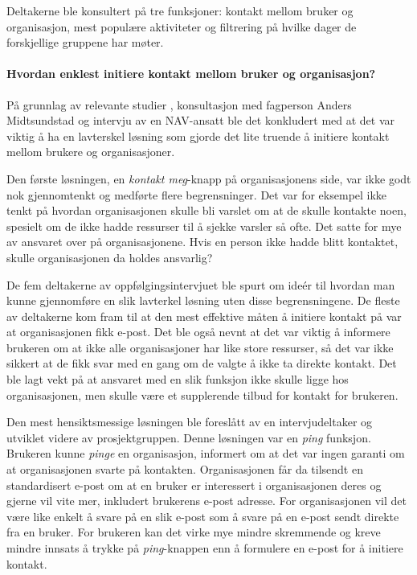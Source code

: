 Deltakerne ble konsultert på tre funksjoner: kontakt mellom bruker og organisasjon, mest populære aktiviteter og filtrering på hvilke dager de forskjellige gruppene har møter.

\paragraph{Hvordan enklest initiere kontakt mellom bruker og organisasjon?} 
På grunnlag av relevante studier %
, konsultasjon med fagperson Anders Midtsundstad \cite{MIDTSUNDSTAD-INTERVJU:15} og intervju av en NAV-ansatt \cite{NAV-INTERVJU:16} ble det konkludert med at det var viktig å ha en lavterskel løsning som gjorde det lite truende å initiere kontakt mellom brukere og organisasjoner.

Den første løsningen, en {\em  kontakt meg}-knapp på organisasjonens side, var ikke godt nok gjennomtenkt og medførte flere begrensninger. Det var for eksempel ikke tenkt på hvordan organisasjonen skulle bli varslet om at de skulle kontakte noen, spesielt om de ikke hadde ressurser til å sjekke varsler så ofte. Det satte for mye av ansvaret over på organisasjonene. Hvis en person ikke hadde blitt kontaktet, skulle organisasjonen da holdes ansvarlig?

De fem deltakerne av oppfølgingsintervjuet ble spurt om ideér til hvordan man kunne gjennomføre en slik lavterkel løsning uten disse begrensningene. De fleste av deltakerne kom fram til at den mest effektive måten å initiere kontakt på var at organisasjonen fikk e-post. Det ble også nevnt at det var viktig å informere brukeren om at ikke alle organisasjoner har like store ressurser, så det var ikke sikkert at de fikk svar med en gang om de valgte å ikke ta direkte kontakt. Det ble lagt vekt på at ansvaret med en slik funksjon ikke skulle ligge hos organisasjonen, men skulle være et supplerende tilbud for kontakt for brukeren. 

Den mest hensiktsmessige løsningen ble foreslått av en intervjudeltaker og utviklet videre av prosjektgruppen. Denne løsningen var en {\em ping} funksjon. Brukeren kunne {\em pinge} en organisasjon, informert om at det var ingen garanti om at organisasjonen svarte på kontakten. Organisasjonen får da tilsendt en standardisert e-post om at en bruker er interessert i organisasjonen deres og gjerne vil vite mer, inkludert brukerens e-post adresse. For organisasjonen vil det være like enkelt å svare på en slik e-post som å svare på en e-post sendt direkte fra en bruker. For brukeren kan det virke mye mindre skremmende og kreve mindre innsats å trykke på {\em ping}-knappen enn å formulere en e-post for å initiere kontakt.

